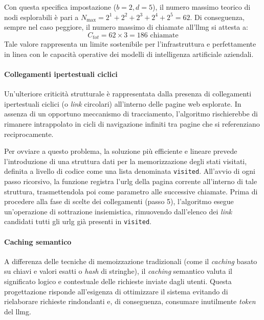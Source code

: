 Con questa specifica impostazione ($b=2, d=5$), il numero massimo teorico di nodi 
esplorabili è pari a $N_{\max} = 2^1 + 2^2 + 2^3 + 2^4 + 2^5 = 62$. 
Di conseguenza, sempre nel caso peggiore, il numero massimo di chiamate all'\gls{llmg} si attesta a:
\begin{equation}
    C_{tot} = 62 \times 3 = 186 \text{ chiamate}
\end{equation}
Tale valore rappresenta un limite sostenibile per l'infrastruttura 
e perfettamente in linea con le capacità operative dei modelli di intelligenza 
artificiale aziendali.

\paragraph{Collegamenti ipertestuali ciclici}
Un'ulteriore criticità strutturale è rappresentata dalla presenza di 
collegamenti ipertestuali ciclici (o \textit{link} circolari) all'interno 
delle pagine web esplorate. 
In assenza di un opportuno meccanismo di tracciamento, l'algoritmo 
rischierebbe di rimanere intrappolato in cicli di navigazione infiniti tra 
pagine che si referenziano reciprocamente.

Per ovviare a questo problema, la soluzione più efficiente e lineare prevede 
l'introduzione di una struttura dati per la memorizzazione degli stati visitati, 
definita a livello di codice come una lista denominata \texttt{visited}. 
All'avvio di ogni passo ricorsivo, la funzione registra l'\gls{urlg} della pagina 
corrente all'interno di tale struttura, trasmettendola poi come parametro alle 
successive chiamate. 
Prima di procedere alla fase di scelte dei collegamenti (passo 5), 
l'algoritmo esegue un'operazione di sottrazione insiemistica, 
rimuovendo dall'elenco dei \textit{link} candidati tutti gli \gls{urlg} già 
presenti in \texttt{visited}.

\paragraph{Caching semantico}
A differenza delle tecniche di memoizzazione tradizionali 
(come il \textit{caching} basato su chiavi e valori esatti o \textit{hash} 
di stringhe), il \textit{caching} semantico valuta il significato logico 
e contestuale delle richieste inviate dagli utenti. 
Questa progettazione risponde all'esigenza di ottimizzare 
il sistema evitando di rielaborare richieste rindondanti e, 
di conseguenza, consumare inutilmente \textit{token} del \gls{llmg}.

